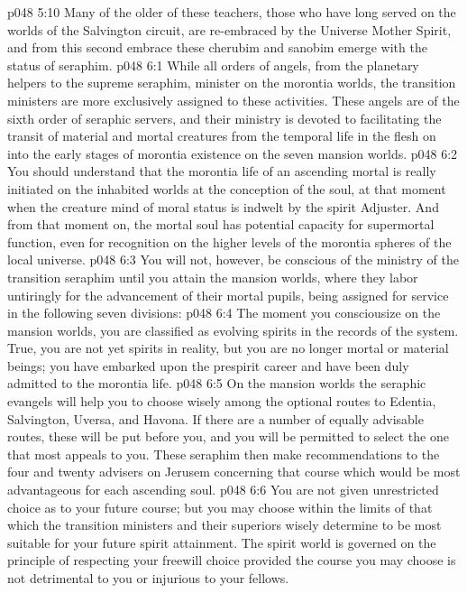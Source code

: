 \vs p048 5:10 Many of the older of these teachers, those who have long served on the worlds of the Salvington circuit, are re\hyp{}embraced by the Universe Mother Spirit, and from this second embrace these cherubim and sanobim emerge with the status of seraphim.\plusone
{}
\vs p048 6:1 While all orders of angels, from the planetary helpers to the supreme seraphim, minister on the morontia worlds, the transition ministers are more exclusively assigned to these activities. These angels are of the sixth order of seraphic servers, and their ministry is devoted to facilitating the transit of material and mortal creatures from the temporal life in the flesh on into the early stages of morontia existence on the seven mansion worlds.
\vs p048 6:2 You should understand that the morontia life of an ascending mortal is really initiated on the inhabited worlds at the conception of the soul, at that moment when the creature mind of moral status is indwelt by the spirit Adjuster. And from that moment on, the mortal soul has potential capacity for supermortal function, even for recognition on the higher levels of the morontia spheres of the local universe.
\pc \vs p048 6:3 You will not, however, be conscious of the ministry of the transition seraphim until you attain the mansion worlds, where they labor untiringly for the advancement of their mortal pupils, being assigned for service in the following seven divisions:
\pc \vs p048 6:4 \bibnobreakspace {} The moment you consciousize on the mansion worlds, you are classified as evolving spirits in the records of the system. True, you are not yet spirits in reality, but you are no longer mortal or material beings; you have embarked upon the prespirit career and have been duly admitted to the morontia life.
\vs p048 6:5 On the mansion worlds the seraphic evangels will help you to choose wisely among the optional routes to Edentia, Salvington, Uversa, and Havona. If there are a number of equally advisable routes, these will be put before you, and you will be permitted to select the one that most appeals to you. These seraphim then make recommendations to the four and twenty advisers on Jerusem concerning that course which would be most advantageous for each ascending soul.
\vs p048 6:6 You are not given unrestricted choice as to your future course; but you may choose within the limits of that which the transition ministers and their superiors wisely determine to be most suitable for your future spirit attainment. The spirit world is governed on the principle of respecting your freewill choice provided the course you may choose is not detrimental to you or injurious to your fellows.
